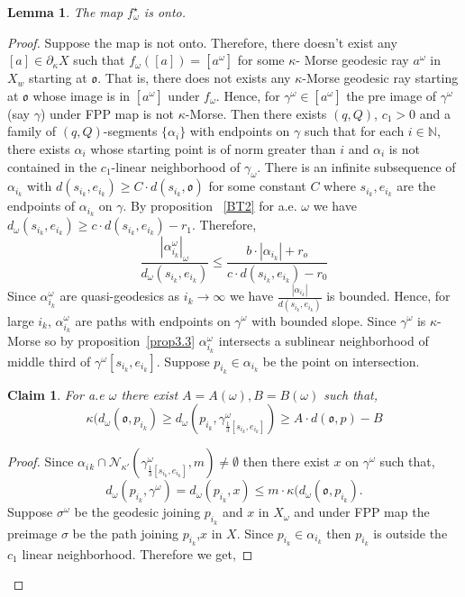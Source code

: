 \documentclass[12 pt]{amsart}
\newcommand{\NN}{\mathbb{N}}
\newtheorem{lemma}[theorem]{Lemma}
\newtheorem{claim}[theorem]{Claim}
\theoremstyle{definition}
\theoremstyle{remark}
\newcommand{\pka}{\partial_{\kappa}}
\begin{document}
\begin{lemma} \label{onto}
    The map $f_\omega^{\star}$  is onto.
\end{lemma}
\begin{proof}
    Suppose the map is not onto. Therefore, there doesn't exist any $[a] \in \pka X$  such that $f_\omega([a])=[a^\omega]$ for some $\kappa$- Morse geodesic ray $a^\omega$ in $X_w$ starting at $\mathfrak{o}.$ That is, there does not exists any $\kappa$-Morse geodesic ray starting at $\mathfrak{o}$ whose image is in $[a^\omega] $ under $f_\omega$. Hence, for $\gamma^\omega \in [a^\omega]$ the pre image of $\gamma^\omega$ (say $\gamma$) under FPP map is not $\kappa$-Morse. Then there exists $(q, Q)$, $c_1 > 0$ and a family of $(q, Q)$-segments $\{\alpha_i \}$ with endpoints on $\gamma$ such that for each $i \in \NN$, there exists $\alpha_i$ whose starting point is of norm greater than $i$ and $\alpha_i$ is not contained in the $c_1$-linear neighborhood of $\gamma_\omega$. There is an infinite subsequence of {$\alpha_{i_k}$} with $d(s_{i_k},e_{i_k})\geq C\cdot d(s_{i_k},\mathfrak{o})$ for some constant $C$ where $s_{i_k},e_{i_k}$ are the endpoints of $\alpha_{i_k}$ on $\gamma$. By proposition ~\ref{BT2} for a.e. $\omega$  we have $d_\omega(s_{i_k},e_{i_k})\geq c \cdot d(s_{i_k},e_{i_k})-r_1$. Therefore,
    \[\frac{|\alpha_{i_k}^\omega|_\omega}{d_\omega(s_{i_k},e_{i_k})} \leq \frac{b \cdot |\alpha_{i_k}|+r_o}{c \cdot d(s_{i_k},e_{i_k})-r_0}\]
    Since  {$\alpha_{i_k}^\omega$} are quasi-geodesics as $i_k \to \infty$ we have $\frac{|\alpha_{i_k}|}{d(s_{i_k},e_{i_k})}$ is bounded. Hence, for large $i_k$, {$\alpha_{i_k}^\omega$} are paths with endpoints on $\gamma^\omega$ with bounded slope. Since $\gamma^\omega$ is $\kappa$-Morse so by proposition~\ref{prop3.3} $\alpha_{i_k}^\omega$ intersects a sublinear neighborhood of middle third of $\gamma^\omega[s_{i_k},e_{i_k}].$ Suppose $p_{i_k} \in \alpha_{i_k}$ be the point on intersection.  
   \begin{claim} \label{313}
     For a.e $\omega$ there exist $A=A(\omega), B=B(\omega)$ such that, \[\kappa(d_\omega(\mathfrak{o},p_{i_k})\geq d_\omega(p_{i_k},\gamma^\omega_{\frac 13[s_{i_k},e_{i_k}]}) \geq A \cdot d(\mathfrak{o},p)-B\]  
   \end{claim}
    \begin{proof}
    Since  $\alpha_i{_k} \cap \mathcal{N}_{\kappa'} (\gamma^\omega_{\frac 13[s_{i_k},e_{i_k}]}, m) \neq \emptyset$ then there exist $x$ on $\gamma^\omega$ such that, \[ d_\omega(p_{i_k}, \gamma^\omega)=d_\omega(p_{i_k}, x) \leq m \cdot \kappa(d_\omega(\mathfrak{o},p_{i_k}).\] Suppose $\sigma^\omega$ be the geodesic joining $p_{i_k}$ and $x$ in $X_\omega$ and under FPP map the preimage $\sigma$ be the path joining $p_{i_k}$,$x$ in $X$. Since $p_{i_k} \in \alpha_{i_k}$ then $p_{i_k}$ is outside the $c_1$ linear neighborhood. Therefore we get, 

\end{proof}
\end{proof}
\end{document}
